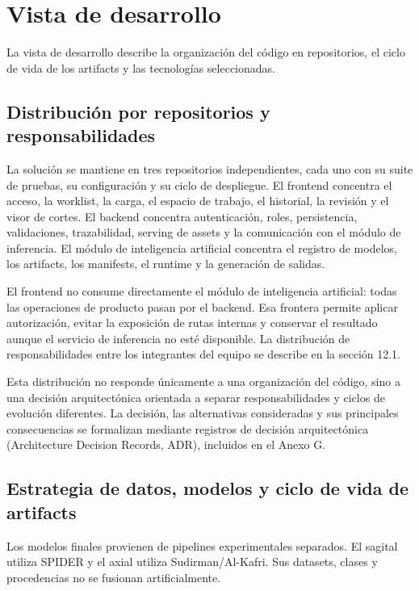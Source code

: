 \section{Vista de desarrollo}

La vista de desarrollo describe la organización del código en repositorios, el ciclo de vida de los artifacts y las tecnologías seleccionadas.

\subsection{Distribución por repositorios y responsabilidades}

La solución se mantiene en tres repositorios independientes, cada uno con su suite de pruebas, su configuración y su ciclo de despliegue. El frontend concentra el acceso, la worklist, la carga, el espacio de trabajo, el historial, la revisión y el visor de cortes. El backend concentra autenticación, roles, persistencia, validaciones, trazabilidad, serving de assets y la comunicación con el módulo de inferencia. El módulo de inteligencia artificial concentra el registro de modelos, los artifacts, los manifests, el runtime y la generación de salidas.

El frontend no consume directamente el módulo de inteligencia artificial: todas las operaciones de producto pasan por el backend. Esa frontera permite aplicar autorización, evitar la exposición de rutas internas y conservar el resultado aunque el servicio de inferencia no esté disponible. La distribución de responsabilidades entre los integrantes del equipo se describe en la sección 12.1.

Esta distribución no responde únicamente a una organización del código, sino a una decisión arquitectónica orientada a separar responsabilidades y ciclos de evolución diferentes. La decisión, las alternativas consideradas y sus principales consecuencias se formalizan mediante registros de decisión arquitectónica (Architecture Decision Records, ADR), incluidos en el Anexo G.

\subsection{Estrategia de datos, modelos y ciclo de vida de artifacts}

Los modelos finales provienen de pipelines experimentales separados. El sagital utiliza SPIDER y el axial utiliza Sudirman/Al-Kafri. Sus datasets, clases y procedencias no se fusionan artificialmente.

